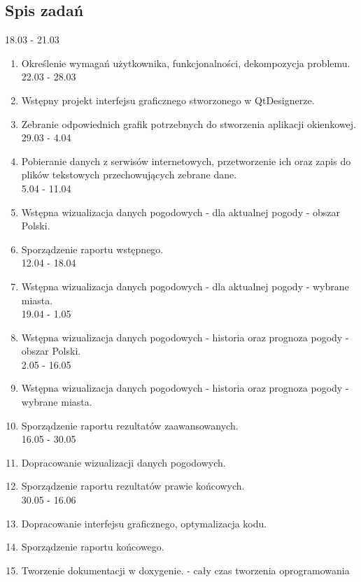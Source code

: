 \documentclass[10pt, a4paper]{article}
\begin{document}
\subsection{Spis zadań}
\hspace{20pt} 18.03 - 21.03

\begin{enumerate}
    \item Określenie wymagań użytkownika, funkcjonalności, dekompozycja problemu. \vspace{9 pt}\\22.03 - 28.03
    \item Wstępny projekt interfejsu graficznego stworzonego w QtDesignerze.
    \item Zebranie odpowiednich grafik potrzebnych do stworzenia aplikacji okienkowej.
    \vspace{9 pt}\\29.03 - 4.04
    \item Pobieranie danych z serwisów internetowych, przetworzenie ich oraz zapis do plików tekstowych przechowujących zebrane dane. 
    \vspace{9 pt}\\5.04 - 11.04
    \item Wstępna wizualizacja danych pogodowych - dla aktualnej pogody - obszar Polski.
    \item Sporządzenie raportu wstępnego.
    \vspace{9 pt}\\12.04 - 18.04
    \item Wstępna wizualizacja danych pogodowych - dla aktualnej pogody - wybrane miasta.
    \vspace{9 pt}\\19.04 - 1.05
    \item Wstępna wizualizacja danych pogodowych - historia oraz prognoza pogody - obszar Polski.
    \vspace{9 pt}\\2.05 - 16.05
    \item Wstępna wizualizacja danych pogodowych - historia oraz prognoza pogody - wybrane miasta.
    \item Sporządzenie raportu rezultatów zaawansowanych.
    \vspace{9 pt}\\16.05 - 30.05
    \item Dopracowanie wizualizacji danych pogodowych. 
    \item Sporządzenie raportu rezultatów prawie końcowych.
    \vspace{9 pt}\\30.05 - 16.06
    \item Dopracowanie interfejsu graficznego, optymalizacja kodu. 
    \item Sporządzenie raportu końcowego.
    \item Tworzenie dokumentacji w doxygenie. - cały czas tworzenia oprogramowania
\end{enumerate}
\end{document}
